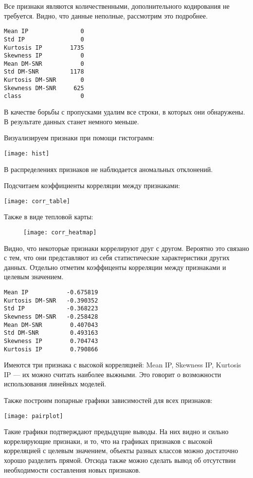 Все признаки являются количественными, дополнительного кодирования не требуется. Видно, что данные неполные, рассмотрим это подробнее.

\begin{lstlisting}[frame=none, numbers=none]
Mean IP               0
Std IP                0
Kurtosis IP        1735
Skewness IP           0
Mean DM-SNR           0
Std DM-SNR         1178
Kurtosis DM-SNR       0
Skewness DM-SNR     625
class                 0
\end{lstlisting}

В качестве борьбы с пропусками удалим все строки, в которых они обнаружены. В результате данных станет немного меньше.

Визуализируем признаки при помощи гистограмм:

\texttt{[image: hist]}

В распределениях признаков не наблюдается аномальных отклонений.
\pagebreak

Подсчитаем коэффициенты корреляции между признаками:

\texttt{[image: corr\_table]}

Также в виде тепловой карты:

\begin{figure}[h]
\centering
\texttt{[image: corr\_heatmap]}
\end{figure}

Видно, что некоторые признаки коррелируют друг с другом. Вероятно это связано с тем, что они представляют из себя статистические характеристики других данных. Отдельно отметим коэффиценты корреляции между признаками и целевым значением.

\begin{lstlisting}[frame=none, numbers=none]
Mean IP           -0.675819
Kurtosis DM-SNR   -0.390352
Std IP            -0.368223
Skewness DM-SNR   -0.258428
Mean DM-SNR        0.407043
Std DM-SNR         0.493163
Skewness IP        0.704743
Kurtosis IP        0.790866
\end{lstlisting}

Имеются три признака с высокой корреляцией: Mean IP, Skewness IP, Kurtosis IP --- их можно считать наиболее выжными. Это говорит о возможности использования линейных моделей.
\pagebreak

Также построим попарные графики зависимостей для всех признаков:

\texttt{[image: pairplot]}

Такие графики подтверждают предыдущие выводы. На них видно и сильно коррелирующие признаки, и то, что на графиках признаков с высокой корреляцией с целевым значением, объекты разных классов можно достаточно хорошо разделить прямой. Отсюда также можно сделать вывод об отсутствии необходимости составления новых признаков.
\pagebreak

